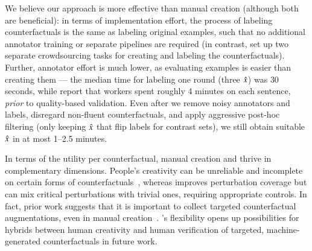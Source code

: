 We believe our approach is more effective than manual creation (although both are beneficial): in terms of implementation effort, the process of labeling counterfactuals is the same as labeling original examples, such that no additional annotator training or separate pipelines are required (in contrast, \citet{kaushik2019learning} set up two separate crowdsourcing tasks for creating and labeling the counterfactuals). 
Further, annotator effort is much lower, as evaluating examples is easier than creating them --- the median time for labeling one round (three $\hat{x}$) was $30$ seconds, while \citet{kaushik2019learning} report that workers spent roughly 4 minutes on each \nli sentence, \emph{prior} to quality-based validation.
Even after we remove noisy annotators and labels, disregard non-fluent counterfactuals, and apply aggressive post-hoc filtering (\eg only keeping $\hat{x}$ that flip labels for contrast sets), we still obtain suitable $\hat{x}$ in at most 1--2.5 minutes.

In terms of the utility per counterfactual, manual creation and \sysname thrive in complementary dimensions. 
People's creativity can be unreliable and incomplete on certain forms of counterfactuals~\cite{ribeiro2018semantically}, whereas \sysname improves perturbation coverage but can mix critical perturbations with trivial ones, requiring appropriate controls.
In fact, prior work suggests that it is important to collect targeted counterfactual augmentations, even in manual creation~\cite{huang2020counterfactually, Khashabi2020MoreBF}.
\sysname's flexibility opens up possibilities for hybrids between human creativity and human verification of targeted, machine-generated counterfactuals in future work.




